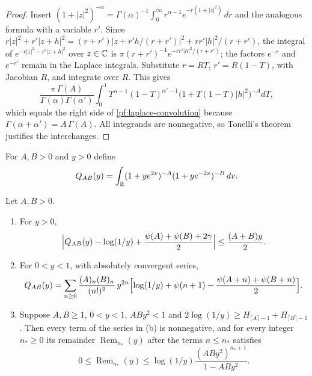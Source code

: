 \begin{proof}
Insert
$(1+|z|^2)^{-\alpha}=\Gamma(\alpha)^{-1}\int_0^\infty
r^{\alpha-1}e^{-r(1+|z|^2)}\,dr$ and the analogous formula with a
variable $r'$. Since
$r|z|^2+r'|z+h|^2=(r+r')|z+r'h/(r+r')|^2+rr'|h|^2/(r+r')$, the
integral of $e^{-r|z|^2-r'|z+h|^2}$ over $z\in\mathbb C$ is
$\pi(r+r')^{-1}e^{-rr'|h|^2/(r+r')}$; the factors $e^{-r}$ and
$e^{-r'}$ remain in the Laplace integrals. Substitute $r=RT$,
$r'=R(1-T)$, with Jacobian $R$, and integrate over $R$. This gives
\[
 \frac{\pi\,\Gamma(A)}{\Gamma(\alpha)\Gamma(\alpha')}
 \int_0^1T^{\alpha-1}(1-T)^{\alpha'-1}\bigl(1+T(1-T)|h|^2\bigr)^{-A}dT,
\]
which equals the right side of \eqref{pf:laplace-convolution} because
$\Gamma(\alpha+\alpha')=A\,\Gamma(A)$. All integrands are nonnegative,
so Tonelli's theorem justifies the interchanges.
\end{proof}

For $A,B>0$ and $y>0$ define
\[
 Q_{AB}(y)=\int_\mathbb R(1+ye^{2v})^{-A}(1+ye^{-2v})^{-B}\,dv .
\]

\begin{lemma}\label{pf:hyperbola}
Let $A,B>0$.
\begin{enumerate}
\item[(a)] For $y>0$,
\begin{equation}\label{pf:elementary-hyperbola-error}
 \Bigl|Q_{AB}(y)-\log(1/y)+\frac{\psi(A)+\psi(B)+2\gamma}{2}\Bigr|
 \le\frac{(A+B)y}2 .
\end{equation}
\item[(b)] For $0<y<1$, with absolutely convergent series,
\[
 Q_{AB}(y)=\sum_{n\ge0}\frac{(A)_n(B)_n}{(n!)^2}\,y^{2n}
 \Bigl[\log(1/y)+\psi(n+1)-\frac{\psi(A+n)+\psi(B+n)}2\Bigr].
\]
\item[(c)] Suppose $A,B\ge1$, $0<y<1$, $ABy^2<1$ and
$2\log(1/y)\ge H_{\lceil A\rceil-1}+H_{\lceil B\rceil-1}$. Then every
term of the series in (b) is nonnegative, and for every integer
$n_*\ge0$ its remainder $\operatorname{Rem}_{n_*}(y)$ after the terms $n\le n_*$
satisfies
\[
 0\le\operatorname{Rem}_{n_*}(y)\le\log(1/y)\frac{(ABy^2)^{n_*+1}}{1-ABy^2}.
\]
\end{enumerate}
\end{lemma}


